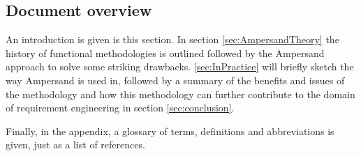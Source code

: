 \subsection{Document overview}
An introduction is given is this section.
In section \autoref{sec:AmpersandTheory} the history of functional methodologies is outlined followed by the Ampersand approach to solve some striking drawbacks.
\autoref{sec:InPractice} will briefly sketch the way Ampersand is used in, followed by a summary of the benefits and issues of the methodology and how this methodology can further contribute to the domain of requirement engineering in section \autoref{sec:conclusion}.

Finally, in the appendix, a glossary of terms, definitions and abbreviations is given, just as a list of references.
